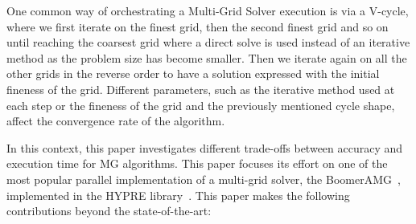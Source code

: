 One common way of orchestrating a Multi-Grid Solver execution is via a V-cycle,
where we first iterate on the finest grid, then the second finest grid and so
on until reaching the coarsest grid where a direct solve is used instead of an
iterative method as the problem size has become smaller.  Then we iterate again
on all the other grids in the reverse order to have a solution expressed with
the initial fineness of the grid.  Different parameters, such as the iterative
method used at each step or the fineness of the grid and the previously
mentioned cycle shape, affect the convergence rate of the algorithm.


In this context, this paper investigates different trade-offs between accuracy
and execution time for MG algorithms. This paper focuses its effort on
one of the most popular parallel implementation of a multi-grid solver, the
BoomerAMG~\cite{boomerAMG}, implemented in the HYPRE
library~\cite{Falgout2002}.  This paper makes the following contributions
beyond the state-of-the-art:

